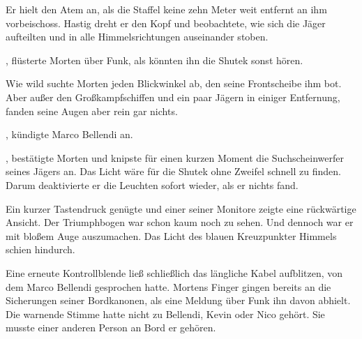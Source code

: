 \par

Er hielt den Atem an, als die Staffel keine zehn Meter weit entfernt an ihm vorbeischoss. Hastig dreht er den Kopf und beobachtete, wie sich die Jäger aufteilten und in alle Himmelsrichtungen auseinander stoben.

\par

, flüsterte Morten über Funk, als könnten ihn die Shutek sonst hören. 

\par

Wie wild suchte Morten jeden Blickwinkel ab, den seine Frontscheibe ihm bot. Aber außer den Großkampfschiffen und ein paar Jägern in einiger Entfernung, fanden seine Augen aber rein gar nichts.

\par

, kündigte Marco Bellendi an. 

\par

, bestätigte Morten und knipste für einen kurzen Moment die Suchscheinwerfer seines Jägers an. Das Licht wäre für die Shutek ohne Zweifel schnell zu finden. Darum deaktivierte er die Leuchten sofort wieder, als er nichts fand.

\par

Ein kurzer Tastendruck genügte und einer seiner Monitore zeigte eine rückwärtige Ansicht. Der Triumphbogen war schon kaum noch zu sehen. Und dennoch war er mit bloßem Auge auszumachen. Das Licht des blauen Kreuzpunkter Himmels schien hindurch.

\par

Eine erneute Kontrollblende ließ schließlich das längliche Kabel aufblitzen, von dem Marco Bellendi gesprochen hatte. Mortens Finger gingen bereits an die Sicherungen seiner Bordkanonen, als eine Meldung über Funk ihn davon abhielt.  Die warnende Stimme hatte nicht zu Bellendi, Kevin oder Nico gehört. Sie musste einer anderen Person an Bord er  gehören.

